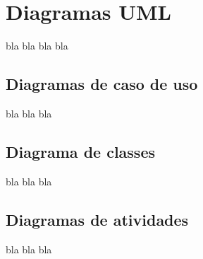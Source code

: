 \section{Diagramas UML}
\label{sec:diagramas}

bla bla bla bla

\subsection{Diagramas de caso de uso}
\label{sec:diagramasDeCasoDeUso}

bla bla bla

\subsection{Diagrama de classes}
\label{sec:diagramaDeClasses}

bla bla bla

\subsection{Diagramas de atividades}
\label{sec:diagramaDeAtividades}

bla bla bla